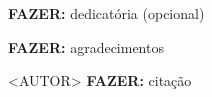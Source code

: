 \begin{dedicatory}
\textbf{FAZER:} dedicatória (opcional)
\end{dedicatory}

\acknowledgements
\textbf{FAZER:} agradecimentos

\begin{epigraph}[<NOTA>]{<AUTOR>}
\textbf{FAZER:} citação
\end{epigraph}
